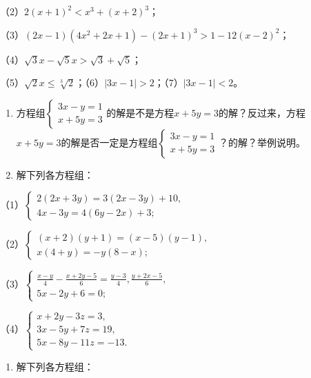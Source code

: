 （2）\(2(x + 1)^{2} < x^{3} + (x + 2)^{3}\)；

（3）\((2x - 1)(4x^{2} + 2x + 1) - (2x + 1)^{3} > 1 - 12(x - 2)^{2}\)；

（4）\(\sqrt{3} x - \sqrt{5} x > \sqrt{3} + \sqrt{5}\)；

（5）\(\sqrt{2} x \leqslant \sqrt[3]{2}\)；（6）\(|3x - 1| > 2\)；（7）\(|3x - 1| < 2\)。

\begin{enumerate}[start=14]
\item
  方程组\(\left\{ \begin{array}{l} 3x - y = 1 \\ x + 5y = 3 \end{array} \right.\)的解是不是方程\(x + 5y = 3\)的解？反过来，方程\(x + 5y = 3\)的解是否一定是方程组\(\left\{ \begin{array}{l} 3x - y = 1 \\ x + 5y = 3 \end{array} \right.\)？的解？举例说明。
\item
  解下列各方程组：
\end{enumerate}

（1）\(\left\{ \begin{array}{l} 2(2x + 3y) = 3(2x - 3y) + 10, \\ 4x - 3y = 4(6y - 2x) + 3; \end{array} \right.\)

（2）\(\left\{ \begin{array}{l} (x + 2)(y + 1) = (x - 5)(y - 1), \\ x(4 + y) = -y(8 - x); \end{array} \right.\)

（3）\(\left\{ \begin{array}{l} \frac{x - y}{4} - \frac{x + 2y - 5}{6} = \frac{y - 3}{4}, \frac{y + 2x - 5}{6}, \\ 5x - 2y + 6 = 0; \end{array} \right.\)

（4）\(\left\{ \begin{array}{l} x + 2y - 3z = 3, \\ 3x - 5y + 7z = 19, \\ 5x - 8y - 11z = -13. \end{array} \right.\)

\begin{enumerate}[start=16]
\item
  解下列各方程组：
\end{enumerate}

